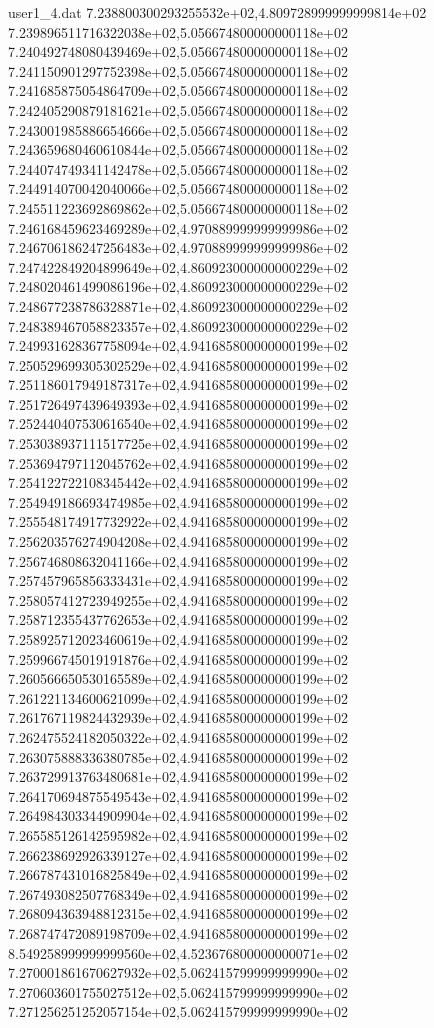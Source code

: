 \begin{filecontents}{user1_4.dat}
7.238800300293255532e+02,4.809728999999999814e+02
7.239896511716322038e+02,5.056674800000000118e+02
7.240492748080439469e+02,5.056674800000000118e+02
7.241150901297752398e+02,5.056674800000000118e+02
7.241685875054864709e+02,5.056674800000000118e+02
7.242405290879181621e+02,5.056674800000000118e+02
7.243001985886654666e+02,5.056674800000000118e+02
7.243659680460610844e+02,5.056674800000000118e+02
7.244074749341142478e+02,5.056674800000000118e+02
7.244914070042040066e+02,5.056674800000000118e+02
7.245511223692869862e+02,5.056674800000000118e+02
7.246168459623469289e+02,4.970889999999999986e+02
7.246706186247256483e+02,4.970889999999999986e+02
7.247422849204899649e+02,4.860923000000000229e+02
7.248020461499086196e+02,4.860923000000000229e+02
7.248677238786328871e+02,4.860923000000000229e+02
7.248389467058823357e+02,4.860923000000000229e+02
7.249931628367758094e+02,4.941685800000000199e+02
7.250529699305302529e+02,4.941685800000000199e+02
7.251186017949187317e+02,4.941685800000000199e+02
7.251726497439649393e+02,4.941685800000000199e+02
7.252440407530616540e+02,4.941685800000000199e+02
7.253038937111517725e+02,4.941685800000000199e+02
7.253694797112045762e+02,4.941685800000000199e+02
7.254122722108345442e+02,4.941685800000000199e+02
7.254949186693474985e+02,4.941685800000000199e+02
7.255548174917732922e+02,4.941685800000000199e+02
7.256203576274904208e+02,4.941685800000000199e+02
7.256746808632041166e+02,4.941685800000000199e+02
7.257457965856333431e+02,4.941685800000000199e+02
7.258057412723949255e+02,4.941685800000000199e+02
7.258712355437762653e+02,4.941685800000000199e+02
7.258925712023460619e+02,4.941685800000000199e+02
7.259966745019191876e+02,4.941685800000000199e+02
7.260566650530165589e+02,4.941685800000000199e+02
7.261221134600621099e+02,4.941685800000000199e+02
7.261767119824432939e+02,4.941685800000000199e+02
7.262475524182050322e+02,4.941685800000000199e+02
7.263075888336380785e+02,4.941685800000000199e+02
7.263729913763480681e+02,4.941685800000000199e+02
7.264170694875549543e+02,4.941685800000000199e+02
7.264984303344909904e+02,4.941685800000000199e+02
7.265585126142595982e+02,4.941685800000000199e+02
7.266238692926339127e+02,4.941685800000000199e+02
7.266787431016825849e+02,4.941685800000000199e+02
7.267493082507768349e+02,4.941685800000000199e+02
7.268094363948812315e+02,4.941685800000000199e+02
7.268747472089198709e+02,4.941685800000000199e+02
8.549258999999999560e+02,4.523676800000000071e+02
7.270001861670627932e+02,5.062415799999999990e+02
7.270603601755027512e+02,5.062415799999999990e+02
7.271256251252057154e+02,5.062415799999999990e+02

\end{filecontents}
